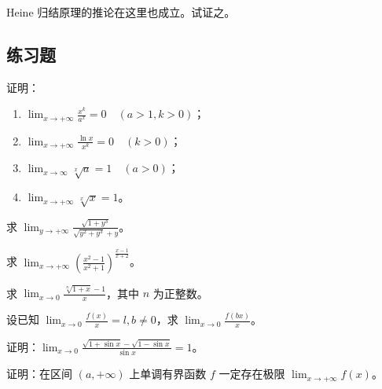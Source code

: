 \begin{xthought}
Heine 归结原理的推论在这里也成立。试证之。
\end{xthought}

\subsection{练习题}

\begin{xexercise}[1]
证明：
  \begin{enumerate}
    \item $\displaystyle\lim_{x\to+\infty}\frac{x^k}{a^x}=0\quad(a>1,k>0)$；
    \item $\displaystyle\lim_{x\to+\infty}\frac{\ln x}{x^k}=0\quad(k>0)$；
    \item $\displaystyle\lim_{x\to\infty}\sqrt[x]{a}=1\quad(a>0)$；
    \item $\displaystyle\lim_{x\to+\infty}\sqrt[x]{x}=1$。
  \end{enumerate}
\end{xexercise}

\begin{xexercise}[2]
求 $\displaystyle\lim_{y\to+\infty}\frac{\sqrt{1+y^3}}{\sqrt{y^2+y^3}+y}$。
\end{xexercise}

\begin{xexercise}[3]
求 $\displaystyle\lim_{x\to+\infty}\left(\frac{x^2-1}{x^2+1}\right)^{\frac{x-1}{x+2}}$。
\end{xexercise}

\begin{xexercise}[4]
求 $\displaystyle\lim_{x\to0}\frac{\sqrt[n]{1+x}-1}{x}$，其中 $n$ 为正整数。
\end{xexercise}

\begin{xexercise}[5]
设已知 $\displaystyle\lim_{x\to0}\frac{f(x)}x=l,b\ne0$，求 $\displaystyle\lim_{x\to0}\frac{f(bx)}x$。
\end{xexercise}

\begin{xexercise}[6]
证明：$\displaystyle\lim_{x\to0}\frac{\sqrt{1+\sin x}-\sqrt{1-\sin x}}{\sin x}=1$。
\end{xexercise}

\begin{xexercise}[7]
证明：在区间 $(a,+\infty)$ 上单调有界函数 $f$ 一定存在极限 $\lim_{x\to+\infty}f(x)$。
\end{xexercise}


